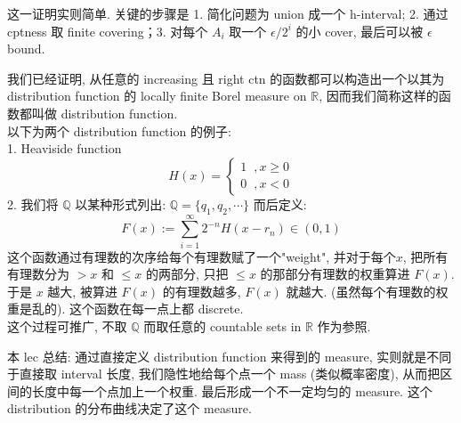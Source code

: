\documentclass[lang=cn,11pt]{elegantbook}
\begin{document}
\begin{remark}
    这一证明实则简单. 关键的步骤是 1. 简化问题为 union 成一个 h-interval; 2. 通过 cptness 取 finite covering；3. 对每个 $A_i $ 取一个 $\epsilon / 2^i$ 的小 cover, 最后可以被 $\epsilon$ bound.
\end{remark}



\begin{example}
我们已经证明, 从任意的 increasing 且 right ctn 的函数都可以构造出一个以其为 distribution function 的 locally finite Borel measure on $\mathbb{R}$, 因而我们简称这样的函数都叫做 distribution function.\\
以下为两个 distribution function 的例子:\\
1.  Heaviside function $$H(x)  = \begin{cases}
    1 \;\; ,x\geq 0\\
    0 \;\; ,x < 0
\end{cases}    $$
2. 我们将 $\mathbb{Q}$ 以某种形式列出: $\mathbb{Q} = \{q_1, q_2, \cdots\}$
而后定义:
$$
F(x) := \sum_{i = 1} ^\infty 2^{-n} H(x - r_n)   \in (0,1)
$$
这个函数通过有理数的次序给每个有理数赋了一个"weight", 并对于每个$x$, 把所有有理数分为 $> x$ 和 $\leq x$ 的两部分, 只把 $\leq x$ 的那部分有理数的权重算进 $F(x)$. 于是 $x$ 越大, 被算进 $F(x)$ 的有理数越多, $F(x)$ 就越大. (虽然每个有理数的权重是乱的). 这个函数在每一点上都 discrete.\\
这个过程可推广, 不取 $\mathbb{Q}$ 而取任意的 countable sets in $\mathbb{R}$ 作为参照.
\end{example}





本 lec 总结: 通过直接定义 distribution function 来得到的 measure, 实则就是不同于直接取 interval 长度, 我们隐性地给每个点一个 mass (类似概率密度), 从而把区间的长度中每一个点加上一个权重. 最后形成一个不一定均匀的 measure. 这个 distribution 的分布曲线决定了这个 measure.
\end{document}
